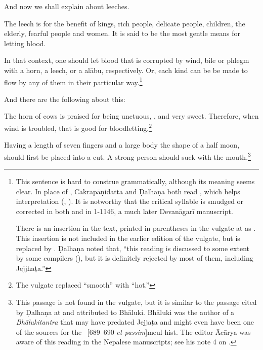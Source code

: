 \begin{translation}    
\item [1] 
    And now we shall explain  about leeches.
    
\item [3] The leech is for the benefit of kings, rich people, delicate people,
children, the elderly, fearful people and women.  It is said to be the most
gentle means for letting blood.

\item [4]

In that context, one should let blood that is corrupted by wind, bile or
phlegm with a horn, a leech, or a \gls{alābu}, respectively.   Or, each kind
can be be made to flow by any of them in their particular way.\footnote{This
    sentence is hard to construe grammatically, although its meaning seems
    clear. In place of , Cakrapāṇidatta and Ḍalhaṇa both read
    , which helps interpretation (\cite[95]{acar-1939},
    \cite[55]{vulgate}). It is notworthy that the critical syllable  is
    smudged or corrected in both  and in 1-1146, a
    much later Devanāgarī manuscript.
      
There is an insertion in the text, printed in parentheses in the
vulgate at  as  .  This insertion is not included in the
earlier edition of the vulgate, but is replaced by
 \citep[54]{susr-trikamji2}. Ḍalhaṇa noted that,
“this reading is discussed to some extent by some compilers
(), but it is definitely rejected by most of them,
including Jejjhaṭa.” }

\item[5x]  And there are the following about this:

\item [1.13.5]

The horn of cows is praised for being unctuous, , and very
sweet.  Therefore, when wind is troubled, that is good for
bloodletting.\footnote{The vulgate replaced “smooth” with “hot.”}

\item [1.13.5a]

Having a length of seven fingers and a large body the shape of a half moon,
should first be placed into a cut.  A strong person should suck with the
mouth.\footnote{This passage is not found in the vulgate, but it is similar
    to the passage cited by Ḍalhaṇa at  and attributed to
    Bhāluki.  Bhāluki was the author of a \emph{Bhālukitantra} that may have
    predated Jejjaṭa and might even have been one of the sources for the \SS\
    [689--690 \emph{et passim}]{meul-hist}. The editor Ācārya was
    aware of this reading in the Nepalese manuscripts; see his note 4 on
    \Su{1.13.5}{55, note 4}.}


\end{translation}
